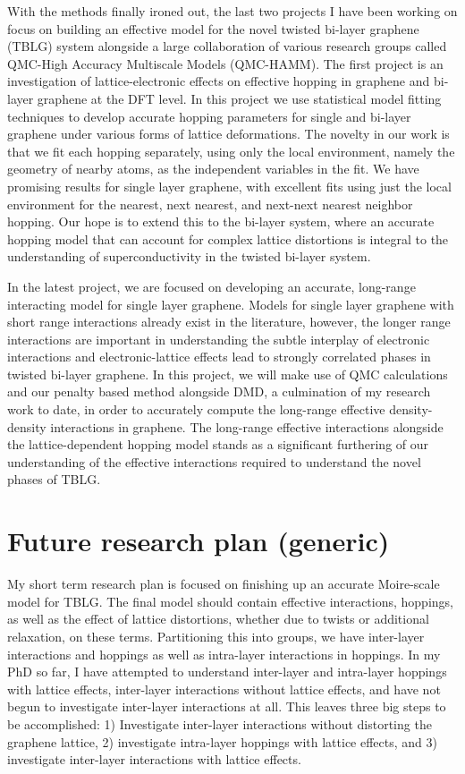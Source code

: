 \documentclass{article}
\begin{document}
With the methods finally ironed out, the last two projects I have been working on focus on building an effective model for the novel twisted bi-layer graphene (TBLG) system alongside a large collaboration of various research groups called QMC-High Accuracy Multiscale Models (QMC-HAMM).
The first project is an investigation of lattice-electronic effects on effective hopping in graphene and bi-layer graphene at the DFT level.
In this project we use statistical model fitting techniques to develop accurate hopping parameters for single and bi-layer graphene under various forms of lattice deformations.
The novelty in our work is that we fit each hopping separately, using only the local environment, namely the geometry of nearby atoms, as the independent variables in the fit.
We have promising results for single layer graphene, with excellent fits using just the local environment for the nearest, next nearest, and next-next nearest neighbor hopping.
Our hope is to extend this to the bi-layer system, where an accurate hopping model that can account for complex lattice distortions is integral to the understanding of superconductivity in the twisted bi-layer system.

In the latest project, we are focused on developing an accurate, long-range interacting model for single layer graphene.
Models for single layer graphene with short range interactions already exist in the literature, however, the longer range interactions are important in understanding the subtle interplay of electronic interactions and electronic-lattice effects lead to strongly correlated phases in twisted bi-layer graphene.
In this project, we will make use of QMC calculations and our penalty based method alongside DMD, a culmination of my research work to date, in order to accurately compute the long-range effective density-density interactions in graphene.
The long-range effective interactions alongside the lattice-dependent hopping model stands as a significant furthering of our understanding of the effective interactions required to understand the novel phases of TBLG.

\section{Future research plan (generic)}
My short term research plan is focused on finishing up an accurate Moire-scale model for TBLG.
The final model should contain effective interactions, hoppings, as well as the effect of lattice distortions, whether due to twists or additional relaxation, on these terms.
Partitioning this into groups, we have inter-layer interactions and hoppings as well as intra-layer interactions in hoppings.
In my PhD so far, I have attempted to understand inter-layer and intra-layer hoppings with lattice effects, inter-layer interactions without lattice effects, and have not begun to investigate inter-layer interactions at all.
This leaves three big steps to be accomplished: 1) Investigate inter-layer interactions without distorting the graphene lattice,  2) investigate intra-layer hoppings with lattice effects, and 3) investigate inter-layer interactions with lattice effects.
\end{document}
